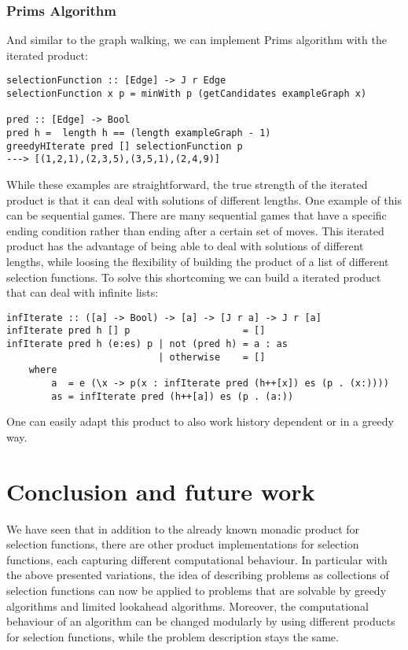 \documentclass[runningheads]{llncs}
\begin{document}
\subsubsection{Prims Algorithm}
And similar to the graph walking, we can implement Prims algorithm with the iterated product:
\begin{verbatim}
selectionFunction :: [Edge] -> J r Edge
selectionFunction x p = minWith p (getCandidates exampleGraph x)

pred :: [Edge] -> Bool
pred h =  length h == (length exampleGraph - 1)
greedyHIterate pred [] selectionFunction p
---> [(1,2,1),(2,3,5),(3,5,1),(2,4,9)]
\end{verbatim}
While these examples are straightforward, the true strength of the iterated product is that it can deal with solutions of different lengths. One example of this can be sequential games. There are many sequential games that have a specific ending condition rather than ending after a certain set of moves. This iterated product has the advantage of being able to deal with solutions of different lengths, while loosing the flexibility of building the product of a list of different selection functions. To solve this shortcoming we can build a iterated product that can deal with infinite lists:
\begin{verbatim}
infIterate :: ([a] -> Bool) -> [a] -> [J r a] -> J r [a]
infIterate pred h [] p                    = []
infIterate pred h (e:es) p | not (pred h) = a : as
                           | otherwise    = []
    where
        a  = e (\x -> p(x : infIterate pred (h++[x]) es (p . (x:))))
        as = infIterate pred (h++[a]) es (p . (a:))
\end{verbatim}
One can easily adapt this product to also work history dependent or in a greedy way. 
%
%
%
\newpage
\section{Conclusion and future work}
\label{Conclusion}
%
%
%
We have seen that in addition to the already known monadic product for selection functions, there are other product implementations for selection functions, each capturing different computational behaviour. In particular with the above presented variations, the idea of describing problems as collections of selection functions can now be applied to problems that are solvable by greedy algorithms and limited lookahead algorithms. Moreover, the computational behaviour of an algorithm can be changed modularly by using different products for selection functions, while the problem description stays the same. 
\end{document}
